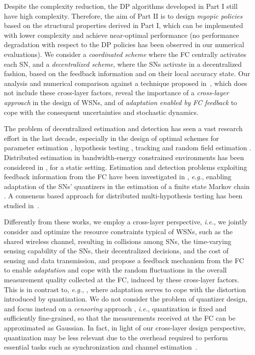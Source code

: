 \documentclass[10pt,twocolumn,twoside]{IEEEtran}
\theoremstyle{plain}
\begin{document}
Despite the complexity reduction, the DP algorithms developed in Part I still have high complexity.
Therefore,  the aim of Part II is to design \emph{myopic policies} based on the structural properties derived in Part I,
which can be implemented with lower complexity and achieve near-optimal performance
 (no performance degradation with respect to the DP policies has been observed in our numerical evaluations).
We consider a \emph{coordinated scheme}
where the FC centrally activates each SN, and 
a \emph{decentralized scheme}, where the SNs activate in a decentralized fashion,
based on the feedback information and on their local accuracy state.
Our analysis and numerical comparison against a technique proposed in~\cite{Msechu},
which does not include these cross-layer factors,
  reveal the importance of a \emph{cross-layer approach} in the design of WSNs,  
and of \emph{adaptation enabled by FC feedback} to cope with the consequent uncertainties and stochastic dynamics.

The problem of decentralized estimation and detection has seen a vast research effort in the last decade,
especially in the design of optimal schemes 
for parameter estimation \cite{Xiao,Thatte,Xiao2}, hypothesis testing \cite{Ray,Tsitsiklis,Chamberland}, tracking \cite{Saber,Epstein} and random field estimation \cite{Fang}.
{Distributed estimation in bandwidth-energy constrained environments has been considered in \cite{Chieh,Ribeiro,Msechu,Junlin}, for a static setting.}
 Estimation and detection problems exploiting
feedback information from the FC have been investigated in \cite{Dogandzic,Peng,Kreidl,Dey},
\emph{e.g.}, enabling adaptation of the SNs' quantizers in the estimation of a finite state Markov chain \cite{Dey}.
A consensus based approach for distributed multi-hypothesis testing has been studied in~\cite{Saligrama}.

Differently from these works, we employ a cross-layer perspective, \emph{i.e.}, we jointly consider and optimize the resource constraints typical of WSNs,
such as the shared wireless channel, resulting in collisions among SNs, the time-varying sensing capability of the SNs, their decentralized decisions,
and the cost of sensing and data transmission, and {propose a feedback mechanism from the FC to enable} \emph{adaptation} and cope with the random fluctuations  in the overall measurement quality collected at the FC,
induced by these cross-layer factors.
This is in contrast to, \emph{e.g.}, \cite{Dey}, where adaptation serves to cope with the distortion introduced by quantization.
We do not consider the problem of quantizer design,
and focus instead on a  \emph{censoring} approach \cite{Appadwedula,Msechu},
\emph{i.e.}, quantization is fixed and sufficiently fine-grained, so that the measurements received at the FC can be approximated as Gaussian.
In fact, in light of our cross-layer design perspective, quantization may be less relevant due to the overhead required to perform essential tasks such as
synchronization and channel estimation~\cite{Appadwedula}. 
\end{document}
